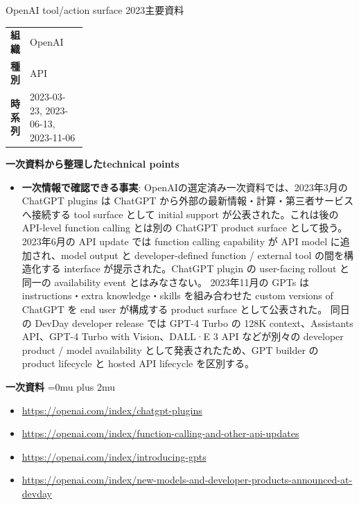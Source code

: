 \begin{technicalnote}{OpenAI tool/action surface 2023}{主要資料}
\begingroup
\begin{tabularx}{\linewidth}{@{}>{\bfseries}p{0.22\linewidth}X@{}}
組織 & OpenAI \\
種別 & API \\
時系列 & 2023-03-23, 2023-06-13, 2023-11-06 \\
\end{tabularx}
\smallskip
{\bfseries 一次資料から整理したtechnical points}
\begin{itemize}[leftmargin=1.5em,itemsep=0.35em]
\item \textbf{一次情報で確認できる事実}: OpenAIの選定済み一次資料では、2023年3月の ChatGPT plugins は ChatGPT から外部の最新情報・計算・第三者サービスへ接続する tool surface として initial support が公表された。これは後の API-level function calling とは別の ChatGPT product surface として扱う。 2023年6月の API update では function calling capability が API model に追加され、model output と developer-defined function / external tool の間を構造化する interface が提示された。ChatGPT plugin の user-facing rollout と同一の availability event とはみなさない。 2023年11月の GPTs は instructions・extra knowledge・skills を組み合わせた custom versions of ChatGPT を end user が構成する product surface として公表された。 同日の DevDay developer release では GPT-4 Turbo の 128K context、Assistants API、GPT-4 Turbo with Vision、DALL·E 3 API などが別々の developer product / model availability として発表されたため、GPT builder の product lifecycle と hosted API lifecycle を区別する。
\end{itemize}
\begin{minipage}{\linewidth}
\begin{samepage}
{\bfseries 一次資料}
\begingroup\sloppy
\Urlmuskip=0mu plus 2mu\relax
\begin{itemize}[leftmargin=1.5em,itemsep=0.25em]
\item {\scriptsize\url{https://openai.com/index/chatgpt-plugins}}
\item {\scriptsize\url{https://openai.com/index/function-calling-and-other-api-updates}}
\item {\scriptsize\url{https://openai.com/index/introducing-gpts}}
\item {\scriptsize\url{https://openai.com/index/new-models-and-developer-products-announced-at-devday}}
\end{itemize}
\endgroup
\end{samepage}
\end{minipage}
\endgroup
\end{technicalnote}
\medskip

